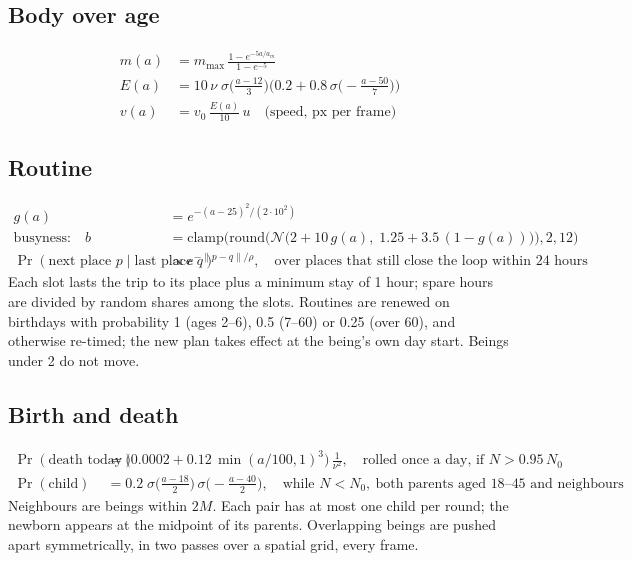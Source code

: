 \subsection*{Body over age}
\begin{align*}
  m(a) &= m_{\max}\,\frac{1 - e^{-5a/a_m}}{1 - e^{-5}} \\
  E(a) &= 10\,\nu\;\sigma\!\Big(\frac{a - 12}{3}\Big)\Big(0.2 + 0.8\,\sigma\!\Big(\!-\frac{a - 50}{7}\Big)\Big) \\
  v(a) &= v_0\,\frac{E(a)}{10}\,u \quad \text{(speed, px per frame)}
\end{align*}

\subsection*{Routine}
\begin{align*}
  g(a) &= e^{-(a - 25)^2 / (2 \cdot 10^2)} \\
  \text{busyness:}\quad b &= \mathrm{clamp}\Big(\mathrm{round}\big(\mathcal{N}\big(2 + 10\,g(a),\; 1.25 + 3.5\,(1 - g(a))\big)\big), 2, 12\Big) \\
  \Pr(\text{next place } p \mid \text{last place } q) &\propto e^{-\lVert p - q \rVert / \rho}, \quad \text{over places that still close the loop within 24 hours}
\end{align*}
Each slot lasts the trip to its place plus a minimum stay of 1 hour; spare hours are divided by random shares among the slots. Routines are renewed on birthdays with probability 1 (ages 2--6), 0.5 (7--60) or 0.25 (over 60), and otherwise re-timed; the new plan takes effect at the being's own day start. Beings under 2 do not move.

\subsection*{Birth and death}
\begin{align*}
  \Pr(\text{death today}) &= \Big(0.0002 + 0.12\,\min(a/100, 1)^3\Big)\,\frac{1}{\nu^2}, \quad \text{rolled once a day, if } N > 0.95\,N_0 \\
  \Pr(\text{child}) &= 0.2\;\sigma\!\Big(\frac{a - 18}{2}\Big)\,\sigma\!\Big(\!-\frac{a - 40}{2}\Big), \quad \text{while } N < N_0,\ \text{both parents aged } 18\text{--}45 \text{ and neighbours}
\end{align*}
Neighbours are beings within $2M$. Each pair has at most one child per round; the newborn appears at the midpoint of its parents. Overlapping beings are pushed apart symmetrically, in two passes over a spatial grid, every frame.


